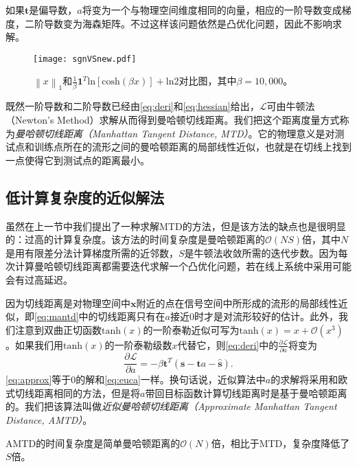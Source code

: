 如果$\mathbf{t}$是偏导数，$a$将变为一个与物理空间维度相同的向量，相应的一阶导数变成梯度，二阶导数变为海森矩阵。不过这样该问题依然是凸优化问题，因此不影响求解。

\begin{figure}[tb]
	\centering
	\texttt{[image: sgnVSnew.pdf]}
	\caption{${\left\| x \right\|}_1$和$\frac{1}{\beta}\mathbf{1}^T\mathrm{ln}\left[ \mathrm{cosh} \left( \beta x \right) \right] + \mathrm{ln}2$对比图，其中$\beta=10,000$。}
	\label{fig:sgnVSnew}
\end{figure}

既然一阶导数和二阶导数已经由\eqref{eq:deri}和\eqref{eq:hessian}给出，$\mathcal{L}$可由牛顿法（Newton's Method）求解从而得到曼哈顿切线距离。我们把这个距离度量方式称为\textit{曼哈顿切线距离（Manhattan Tangent Distance, MTD）}。它的物理意义是对测试点和训练点所在的流形之间的曼哈顿距离的局部线性近似，也就是在切线上找到一点使得它到测试点的距离最小。

\subsection{低计算复杂度的近似解法}

虽然在上一节中我们提出了一种求解MTD的方法，但是该方法的缺点也是很明显的：过高的计算复杂度。该方法的时间复杂度是曼哈顿距离的$\mathcal{O}(NS)$倍，其中$N$是用有限差分法计算梯度所需的近邻数，$S$是牛顿法收敛所需的迭代步数。因为每次计算曼哈顿切线距离都需要迭代求解一个凸优化问题，若在线上系统中采用可能会有过高延迟。

因为切线距离是对物理空间中$\mathbf{x}$附近的点在信号空间中所形成的流形的局部线性近似，即\eqref{eq:mantd}中的切线距离只有在$a$接近0时才是对流形较好的估计。此外，我们注意到双曲正切函数$\mathrm{tanh}(x)$的一阶泰勒近似可写为$\mathrm{tanh}(x) = x + \mathcal{O}\left( x^3 \right)$。如果我们用$\mathrm{tanh}(x)$的一阶泰勒级数$x$代替它，则\eqref{eq:deri}中的$\frac{\partial \mathcal{L}}{\partial a}$将变为
\begin{equation}
\frac{\partial \mathcal{L}}{\partial a} = -\beta \mathbf{t}^T \left( \mathbf{s} - \mathbf{t}a - \widehat{\mathbf{s}} \right). \label{eq:approx}
\end{equation}
\eqref{eq:approx}等于0的解和\eqref{eq:euca}一样。换句话说，近似算法中$a$的求解将采用和欧式切线距离相同的方法，但是将$a$带回目标函数计算切线距离时是基于曼哈顿距离的。我们把该算法叫做\textit{近似曼哈顿切线距离（Approximate Manhattan Tangent Distance, AMTD）}。

AMTD的时间复杂度是简单曼哈顿距离的$\mathcal{O}(N)$倍，相比于MTD，复杂度降低了$S$倍。

